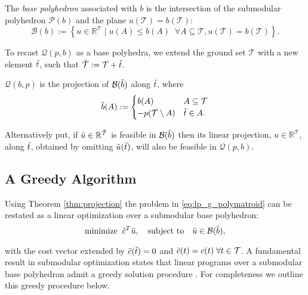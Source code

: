\begin{definition} The \emph{base polyhedron} associated with $b$ is the intersection of the submodular polyhedron $ \mathcal{P}(b)$ and the plane $u(\mathcal{T}) = b(\mathcal{T})$:
\begin{equation*}
    \mathcal{B}(b) := \left\{ u \in  \mathbb{R}^{\mathcal{T}} \mid u(A) \leq b(A) \;\; \forall A \subseteq \mathcal{T}, u(\mathcal{T}) = b(\mathcal{T})\right\}.
\end{equation*} 
\end{definition}
To recast $\mathcal{Q}(p,b)$ as a base polyhedra, we extend the ground set $\mathcal{T}$ with a new element $\Tilde{t}$, such that $\Tilde{\mathcal{T}} := \mathcal{T} + \Tilde{t}$. 

\begin{theorem}[Projection]\label{thm:projection}\cite[Theorem 14.2.4]{Frank2011ConnectionsOptimization} 
$\mathcal{Q}(b,p)$ is the projection of $\mathcal{B}(\Tilde{b})$ along $\Tilde{t}$, where 
\begin{equation*}
        \Tilde{b}(A) := 
        \begin{cases}
            b(A)                    & A \subseteq \mathcal{T}\\
            -p(\mathcal{T} \setminus A)     & \Tilde{t} \in A.
        \end{cases}
\end{equation*}
\end{theorem}
Alternatively put, if $\Tilde{u} \in \mathbb{R}^{\Tilde{\mathcal{T}}}$ is feasible in $\mathcal{B}(\Tilde{b})$ then its linear projection, $u \in \mathbb{R}^\mathcal{T}$, along $\Tilde{t}$, obtained by omitting $\Tilde{u}(\Tilde{t})$, will also be feasible in $\mathcal{Q}(p,b)$. 

\subsection{A Greedy Algorithm}\label{subsection:greedy}
Using Theorem \ref{thm:projection} the problem in \eqref{eq:lp_g_polymatroid} can be restated as a linear optimization over a submodular base polyhedron:
\begin{equation}\label{eq:lp_base}
    \underset{}{\text{minimize}} \;\; \Tilde{c}^T \Tilde{u}, \quad
    \text{subject to} \quad \Tilde{u} \in \mathcal{B}(\Tilde{b}), 
\end{equation}
with the cost vector extended by $\Tilde{c}(\Tilde{t}) = 0$ and $\Tilde{c}(t) = c(t) \; \forall t \in \mathcal{T}$.
A fundamental result in submodular optimization states that linear programs over a submodular base polyhedron admit a greedy solution procedure \cite{Fujishige2005SubmodularOptimization}. For completeness we outline this greedy procedure below. 

